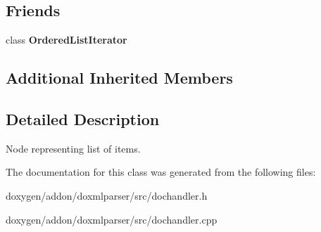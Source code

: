 \subsection*{Friends}
\begin{DoxyCompactItemize}
\item 
\mbox{\label{class_ordered_list_handler_acf24a8e48a5a671162b6c6f410c30079}} 
class {\bfseries Ordered\+List\+Iterator}
\end{DoxyCompactItemize}
\subsection*{Additional Inherited Members}


\subsection{Detailed Description}
Node representing list of items. 



The documentation for this class was generated from the following files\+:\begin{DoxyCompactItemize}
\item 
doxygen/addon/doxmlparser/src/dochandler.\+h\item 
doxygen/addon/doxmlparser/src/dochandler.\+cpp\end{DoxyCompactItemize}
